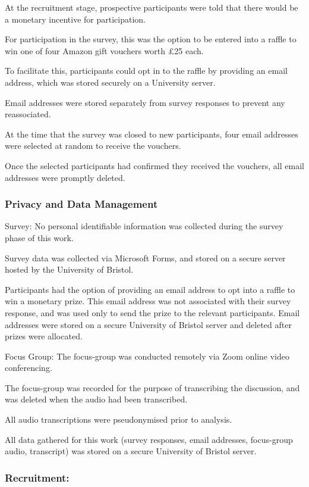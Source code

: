 \documentclass[manuscript,screen,review]{acmart}
\begin{document}
At the recruitment stage, prospective participants were told that there would be a monetary incentive for participation.

For participation in the survey, this was the option to be entered into a raffle to win one of four Amazon gift vouchers worth £25 each.

To facilitate this, participants could opt in to the raffle by providing an email address, which was stored securely on a University server. 

Email addresses were stored separately from survey responses to prevent any reassociated. 

At the time that the survey was closed to new participants, four email addresses were selected at random to receive the vouchers.

Once the selected participants had confirmed they received the vouchers, all email addresses were promptly deleted. 



\subsubsection{Privacy and Data Management}  


Survey:
No personal identifiable information was collected during the survey phase of this work.

Survey data was collected via Microsoft Forms, and stored on a secure server hosted by the University of Bristol.

Participants had the option of providing an email address to opt into a raffle to win a monetary prize. 
This email address was not associated with their survey response, and was used only to send the prize to the relevant participants. 
Email addresses were stored on a secure University of Bristol server and deleted after prizes were allocated.  

Focus Group:
The focus-group was conducted remotely via Zoom online video conferencing. 

The focus-group was recorded for the purpose of transcribing the discussion, and was deleted when the audio had been transcribed. 

All audio transcriptions were pseudonymised prior to analysis.

All data gathered for this work (survey responses, email addresses, focus-group audio, transcript) was stored on a secure University of Bristol server. 

\subsubsection{Recruitment:}  
\end{document}

